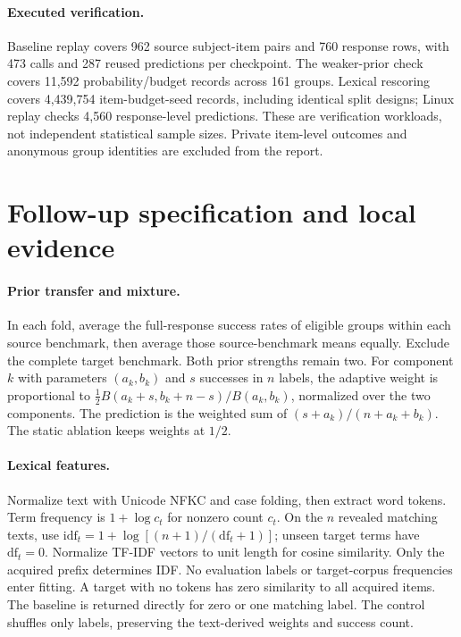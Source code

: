 \documentclass{article}
\begin{document}
\paragraph{Executed verification.}
Baseline replay covers 962 source subject-item pairs and 760 response rows,
with 473 calls and 287 reused predictions per checkpoint. The weaker-prior
check covers 11,592 probability/budget records across 161 groups. Lexical
rescoring covers 4,439,754 item-budget-seed records, including identical split
designs; Linux replay checks 4,560 response-level predictions. These are
verification workloads, not independent statistical sample sizes. Private
item-level outcomes and anonymous group identities are excluded from the report.
\clearpage
\section{Follow-up specification and local evidence}
\paragraph{Prior transfer and mixture.}
In each fold, average the full-response success rates of eligible groups within
each source benchmark, then average those source-benchmark means equally.
Exclude the complete target benchmark. Both prior strengths remain two.
For component $k$ with parameters $(a_k,b_k)$ and $s$ successes in $n$ labels,
the adaptive weight is proportional to
$\tfrac12 B(a_k+s,b_k+n-s)/B(a_k,b_k)$, normalized over the two components.
The prediction is the weighted sum of $(s+a_k)/(n+a_k+b_k)$.
The static ablation keeps weights at $1/2$.

\paragraph{Lexical features.}
Normalize text with Unicode NFKC and case folding, then extract word tokens.
Term frequency is $1+\log c_t$ for nonzero count $c_t$.
On the $n$ revealed matching texts, use
$\mathrm{idf}_t=1+\log[(n+1)/(\mathrm{df}_t+1)]$; unseen target terms have
$\mathrm{df}_t=0$. Normalize TF-IDF vectors to unit length for cosine similarity.
Only the acquired prefix determines IDF. No evaluation labels or target-corpus
frequencies enter fitting. A target with no tokens has zero similarity to all
acquired items. The baseline is returned directly for zero or one matching label.
The control shuffles only labels, preserving the text-derived weights and success count.
\end{document}
